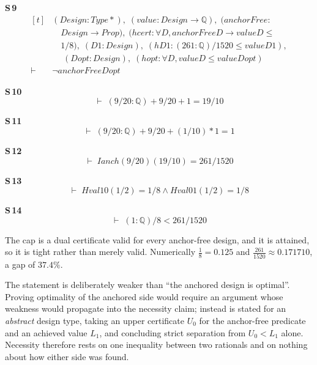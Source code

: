 \noindent\textbf{S\,9}\quad{}
{\footnotesize\[ \begin{aligned}[t]
&(\mathit{Design} : \mathit{Type}*),\; (\mathit{value} : \mathit{Design} \to \mathbb{Q} ),\; (\mathit{anchorFree} :\\
&\quad \mathit{Design} \to \mathit{Prop}),\; (\mathit{hcert} : \forall \mathit{D}, \mathit{anchorFree} \mathit{D} \to \mathit{value} \mathit{D} \leq\\
&\quad 1/8),\; (\mathit{D1} : \mathit{Design}),\; (\mathit{hD1} : (261 : \mathbb{Q} )/1520 \leq \mathit{value} \mathit{D1}),\\
&\quad \; (\mathit{Dopt} : \mathit{Design}),\; (\mathit{hopt} : \forall \mathit{D}, \mathit{value} \mathit{D} \leq \mathit{value} \mathit{Dopt})\\
\vdash\;&\neg \mathit{anchorFree} \mathit{Dopt}
\end{aligned} \]}

\noindent\textbf{S\,10}\quad{}
{\footnotesize\[ \vdash\; (9/20 : \mathbb{Q} ) + 9/20 + 1 = 19/10 \]}

\noindent\textbf{S\,11}\quad{}
{\footnotesize\[ \vdash\; (9/20 : \mathbb{Q} ) + 9/20 + (1/10) * 1 = 1 \]}

\noindent\textbf{S\,12}\quad{}
{\footnotesize\[ \vdash\; \mathit{Ianch} (9/20) (19/10) = 261 / 1520 \]}

\noindent\textbf{S\,13}\quad{}
{\footnotesize\[ \vdash\; \mathit{Hval} 1 0 (1/2) = 1 / 8 \wedge \mathit{Hval} 0 1 (1/2) = 1 / 8 \]}

\noindent\textbf{S\,14}\quad{}
{\footnotesize\[ \vdash\; (1 : \mathbb{Q} ) / 8 < 261 / 1520 \]}


The cap is a dual certificate valid for every anchor-free design, and it is attained, so it
is tight rather than merely valid. Numerically $\tfrac18=0.125$ and
$\tfrac{261}{1520}\approx0.171710$, a gap of $37.4\%$.

The statement is deliberately weaker than ``the anchored design is optimal''. Proving
optimality of the anchored side would require an argument whose weakness would propagate
into the necessity claim; instead  is stated for an \emph{abstract}
design type, taking an upper certificate $U_{0}$ for the anchor-free predicate and an
achieved value $L_{1}$, and concluding strict separation from $U_{0}<L_{1}$ alone. Necessity
therefore rests on one inequality between two rationals and on nothing about how either side
was found.

